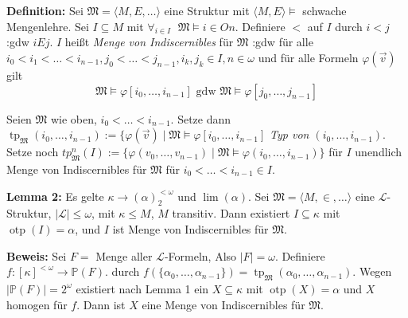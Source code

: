 \documentclass[a4paper,fontsize=11pt]{scrartcl}
\newcommand{\otp}{\operatorname{otp}}
\newcommand{\tp}{\operatorname{tp}}
\begin{document}
{\bf Definition:}
  Sei $\mathfrak M=\langle M,E,\ldots\rangle$ eine Struktur mit $\langle M,E\rangle\models$ schwache Mengenlehre.
  Sei $I\subseteq M$ mit $\forall_{i\in I}\;$ $\mathfrak M\models i\in On$. 
  Definiere $<$ auf $I$ durch $i<j$ :gdw $iEj$.
  $I$ heißt \emph{Menge von Indiscernibles} für $\mathfrak M$ :gdw 
  für alle $i_0<i_1<\ldots<i_{n-1}, j_0<\ldots<j_{n-1}, i_k, j_k\in I, n\in\omega$ und für alle Formeln $\varphi(\vec v)$ gilt
  $$\mathfrak M\models \varphi[i_0,\ldots,i_{n-1}] \mbox{ gdw } \mathfrak M\models \varphi[j_0,\ldots,j_{n-1}]$$

  Seien $\mathfrak M$ wie oben, $i_0<\ldots<i_{n-1}$.
  Setze dann $\tp_{\mathfrak M}(i_0,\ldots,i_{n-1}) :=\{\varphi(\vec v)\mid \mathfrak M\models\varphi[i_0,\ldots,i_{n-1}]$ \emph{Typ von $(i_0,\ldots,i_{n-1})$}.
  Setze noch $tp_{\mathfrak M}^n (I) := \{ \varphi(v_0,\ldots,v_{n-1})\mid \mathfrak M\models \varphi(i_0,\ldots, i_{n-1})\}$
  für $I$ unendlich Menge von Indiscernibles für $\mathfrak M$ für $i_0<\ldots<i_{n-1}\in I$.
  
{\bf Lemma 2:} Es gelte $\kappa\to(\alpha)^{<\omega}_2$ und $\lim(\alpha)$.
  Sei $\mathfrak M =\langle M,\in,\ldots\rangle$ eine $\mathcal L$-Struktur, $|\mathcal L| \le \omega$, mit $\kappa\le M$, $M$ transitiv.
  Dann existiert $I\subseteq \kappa$ mit $\otp(I)=\alpha$, und $I$ ist Menge von Indiscernibles für $\mathfrak M$.
  
  {\bf Beweis:} Sei $F=$ Menge aller $\mathcal L$-Formeln, Also $|F|=\omega$.
    Definiere $f\colon [\kappa]^{<\omega}\to\mathbb P(F)$. %
    durch $f(\{\alpha_0,\ldots,\alpha_{n-1}\})=\tp_{\mathfrak M}(\alpha_0,\ldots,\alpha_{n-1})$.
    Wegen $|\mathbb P(F)|=2^{\omega}$ existiert nach Lemma 1 ein $X\subseteq\kappa$ mit $\otp(X)=\alpha$ und $X$ homogen für $f$.
    Dann ist $X$ eine Menge von Indiscernibles für $\mathfrak M$.
\end{document}
